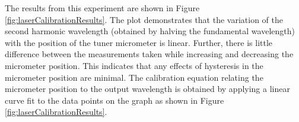 

The results from this experiment are shown in Figure \ref{fig:laserCalibrationResults}.
The plot demonstrates that the variation of the second harmonic wavelength (obtained by halving the fundamental wavelength) with the position of the tuner micrometer is linear.
Further, there is little difference between the measurements taken while increasing and decreasing the micrometer position.
This indicates that any effects of hysteresis in the micrometer position are minimal.
The calibration equation relating the micrometer position to the output wavelength is obtained by applying a linear curve fit to the data points on the graph as shown in Figure \ref{fig:laserCalibrationResults}.

